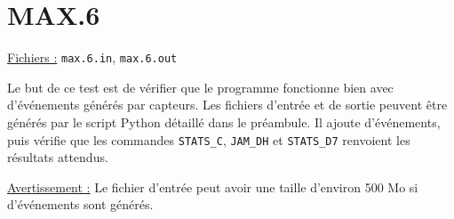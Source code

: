 \documentclass[11pt,a4paper]{article}
\begin{document}
\section*{MAX.6}
\label{sec:MAX.6}

\underline{Fichiers :} \texttt{max.6.in}, \texttt{max.6.out}

Le but de ce test est de vérifier que le programme fonctionne bien avec  d'événements générés par  capteurs. Les fichiers d'entrée et de sortie peuvent être générés par le script Python détaillé dans le préambule. Il ajoute  d'événements, puis vérifie que les commandes \texttt{STATS\_C}, \texttt{JAM\_DH} et \texttt{STATS\_D7} renvoient les résultats attendus.

\underline{Avertissement :} Le fichier d'entrée peut avoir une taille d'environ 500 Mo si  d'événements sont générés.
\end{document}
